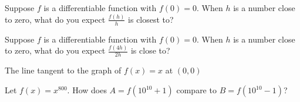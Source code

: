 \documentclass{ximera}
\newcommand{\recommendation}[1]{}
\newcommand{\GoodQuestions}[1]{}
\begin{document}
\begin{shuffle}


\begin{problem}
  Suppose $f$ is a differentiable function with $f(0) = 0$.  When $h$
  is a number close to zero, what do you expect $\frac{f(h)}{h}$ is
  closest to?
  \begin{multipleChoice}
  \end{multipleChoice}
\end{problem}

\begin{problem}
  Suppose $f$ is a differentiable function with $f(0)=0$.  When $h$ is
  a number close to zero, what do you expect $\frac{f(4h)}{2h}$ is
  close to?
  \begin{multipleChoice}
  \end{multipleChoice}
\end{problem}




\begin{problem}
  The line tangent to the graph of $f(x)=x$ at $(0,0)$
  \begin{multipleChoice}
  \end{multipleChoice}
\end{problem}



\begin{problem}
  Let $f(x) = x^{800}$.  How does $A = f(10^{10} + 1)$ compare to $B = f(10^{10} - 1)$?
  \begin{multipleChoice}
  \end{multipleChoice}
\end{problem}


\end{shuffle}
\end{document}
